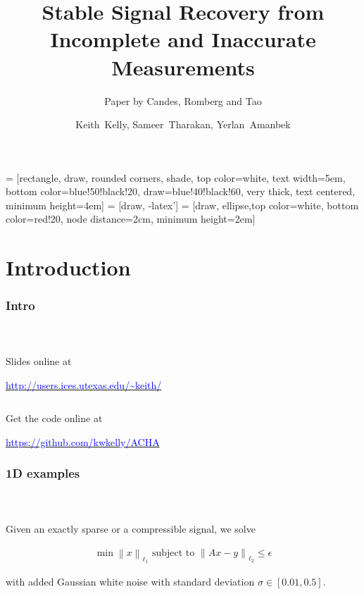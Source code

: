 \documentclass[mathserif,18pt,xcolor=table]{beamer}
\title{Stable Signal Recovery from Incomplete and Inaccurate Measurements}
\subtitle{Paper by Candes, Romberg and Tao}
\author[Keith Kelly, Sameer~Tharakan, Yerlan~Amanbek]{ {Keith~Kelly, Sameer~Tharakan, Yerlan~Amanbek} \\  
}
\institute{Institute for Computational Engineering \& Sciences\\ \mbox{}  \\  \pgfuseimage{utbig} }
\date[ACHA]
\newcommand{\norm}[1]{\left\lVert #1 \right\rVert}
\begin{document}
 = [rectangle, draw, rounded corners, shade, top color=white, text width=5em,
  bottom color=blue!50!black!20, draw=blue!40!black!60, very thick, text centered, minimum height=4em]
   = [draw, -latex']
   = [draw, ellipse,top color=white, bottom color=red!20, node distance=2cm, minimum height=2em]


  \beamertemplateballitem

  \frame{\titlepage}



\section{Introduction}

\begin{frame}[t]
\frametitle{Intro}
\framesubtitle{~~}  %

Slides online at

\href{http://users.ices.utexas.edu/~keith/}{\textcolor{blue}{http://users.ices.utexas.edu/\textasciitilde keith/}}

$$
$$

Get the code online at

\href{https://github.com/kwkelly/ACHA}{\textcolor{blue}{https://github.com/kwkelly/ACHA}}


\end{frame}



\begin{frame}[t]
\frametitle{1D examples}
\framesubtitle{~~}  %

Given an exactly sparse or a compressible signal, we solve

\begin{align*}
	\min \norm{x}_{\ell_1} \text{ subject to } \norm{Ax - y}_{\ell_2} \leq \epsilon
\end{align*}

with added Gaussian white noise with standard deviation $\sigma\in [0.01,0.5]$.


\end{frame}
\end{document}
